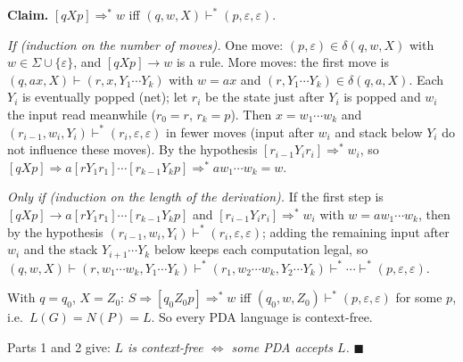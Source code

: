 \documentclass[11pt,a4paper]{article}
\newcommand{\eps}{\varepsilon}
\newcommand{\sub}[1]{\par\smallskip{\sffamily\bfseries\small\color{inksoft}#1}\par}
\begin{document}
\begin{solution}
\textbf{Claim.} $[qXp]\Rightarrow^*w$ iff $(q,w,X)\vdash^*(p,\eps,\eps)$.

\emph{If (induction on the number of moves).} One move: $(p,\eps)\in\delta(q,w,X)$ with $w\in\Sigma\cup\{\eps\}$, and $[qXp]\to w$ is a rule. More moves: the first move is $(q,ax,X)\vdash(r,x,Y_1\cdots Y_k)$ with $w=ax$ and $(r,Y_1\cdots Y_k)\in\delta(q,a,X)$. Each $Y_i$ is eventually popped (net); let $r_i$ be the state just after $Y_i$ is popped and $w_i$ the input read meanwhile ($r_0=r$, $r_k=p$). Then $x=w_1\cdots w_k$ and $(r_{i-1},w_i,Y_i)\vdash^*(r_i,\eps,\eps)$ in fewer moves (input after $w_i$ and stack below $Y_i$ do not influence these moves). By the hypothesis $[r_{i-1}Y_ir_i]\Rightarrow^*w_i$, so $[qXp]\Rightarrow a[rY_1r_1]\cdots[r_{k-1}Y_kp]\Rightarrow^*aw_1\cdots w_k=w$.

\emph{Only if (induction on the length of the derivation).} If the first step is $[qXp]\to a[rY_1r_1]\cdots[r_{k-1}Y_kp]$ and $[r_{i-1}Y_ir_i]\Rightarrow^*w_i$ with $w=aw_1\cdots w_k$, then by the hypothesis $(r_{i-1},w_i,Y_i)\vdash^*(r_i,\eps,\eps)$; adding the remaining input after $w_i$ and the stack $Y_{i+1}\cdots Y_k$ below keeps each computation legal, so
$(q,w,X)\vdash(r,w_1\cdots w_k,Y_1\cdots Y_k)\vdash^*(r_1,w_2\cdots w_k,Y_2\cdots Y_k)\vdash^*\cdots\vdash^*(p,\eps,\eps)$.

With $q=q_0$, $X=Z_0$: $S\Rightarrow[q_0Z_0p]\Rightarrow^*w$ iff $(q_0,w,Z_0)\vdash^*(p,\eps,\eps)$ for some $p$, i.e.\ $L(G)=N(P)=L$. So every PDA language is context-free.

\sub{Conclusion}
Parts 1 and 2 give: \emph{$L$ is context-free $\iff$ some PDA accepts $L$.} \hfill$\blacksquare$
\end{solution}
\end{document}
